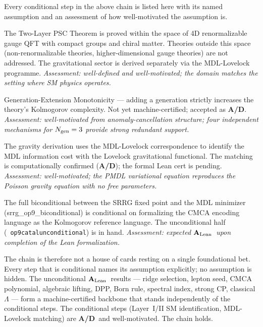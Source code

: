\documentclass[11pt,openany]{book}
\theoremstyle{remark}
\newcommand{\lean}[1]{%
  \penalty-100
  \begingroup\def\_{\textunderscore\allowbreak}\texttt{#1}\endgroup}
\newcommand{\Ngen}{N_{\rm gen}}
\newcommand{\CatAL}{\ensuremath{\textbf{A}_{\rm Lean}}}
\newcommand{\CatAD}{\textbf{A/D}}
\begin{document}
\begin{tcolorbox}[colback=yellow!8,colframe=yellow!60!black,
  title={Named Assumptions Disclosure},breakable]
Every conditional step in the above chain is listed here with its named assumption
and an assessment of how well-motivated the assumption is.
\begin{description}[leftmargin=3.2cm,labelwidth=3.0cm,itemsep=4pt]
\item[TSpace domain:] The Two-Layer PSC Theorem is proved within the space of 4D
  renormalizable gauge QFT with compact groups and chiral matter. Theories outside
  this space (non-renormalizable theories, higher-dimensional gauge theories) are not
  addressed. The gravitational sector is derived separately via the MDL-Lovelock
  programme. \emph{Assessment: well-defined and well-motivated; the domain matches the
  setting where SM physics operates.}
\item[GEM:] Generation-Extension Monotonicity --- adding a generation strictly increases
  the theory's Kolmogorov complexity. Not yet machine-certified; accepted as \CatAD.
  \emph{Assessment: well-motivated from anomaly-cancellation structure; four independent
  mechanisms for $\Ngen = 3$ provide strong redundant support.}
\item[MDL-Lovelock matching:] The gravity derivation uses the MDL-Lovelock
  correspondence to identify the MDL information cost with the Lovelock gravitational
  functional. The matching is computationally confirmed (\CatAD); the formal Lean
  cert is pending. \emph{Assessment: well-motivated; the PMDL variational equation
  reproduces the Poisson gravity equation with no free parameters.}
\item[UGPSubstrateConstraint:] The full biconditional between the SRRG fixed point and
  the MDL minimizer (srrg\_op9\_biconditional) is conditional on formalizing the CMCA
  encoding language as the Kolmogorov reference language. The unconditional half \mbox{(\lean{op9\_catal\_unconditional})} is in hand. \emph{Assessment: expected \CatAL\
  upon completion of the Lean formalization.}
\end{description}
\end{tcolorbox}

The chain is therefore not a house of cards resting on a single foundational bet. Every
step that is conditional names its assumption explicitly; no assumption is hidden. The
unconditional \CatAL\ results --- ridge selection, lepton seed, CMCA polynomial,
algebraic lifting, DPP, Born rule, spectral index, strong CP, classical $\Lambda$ ---
form a machine-certified backbone that stands independently of the conditional steps.
The conditional steps (Layer~I/II SM identification, MDL-Lovelock matching) are
\CatAD\ and well-motivated. The chain holds.
\end{document}
